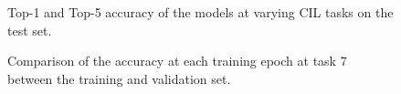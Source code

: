 \begin{figure}[H]
	\centering
	\caption{Top-1 and Top-5 accuracy of the models at varying CIL tasks on the test set.}%
	\label{fig:exp1}%
\end{figure}


\begin{figure}[H]
	\centering
	\caption{Comparison of the accuracy at each training epoch at task 7 between the training and validation set.}%
	\label{fig:exp1-train_val}%
\end{figure}


